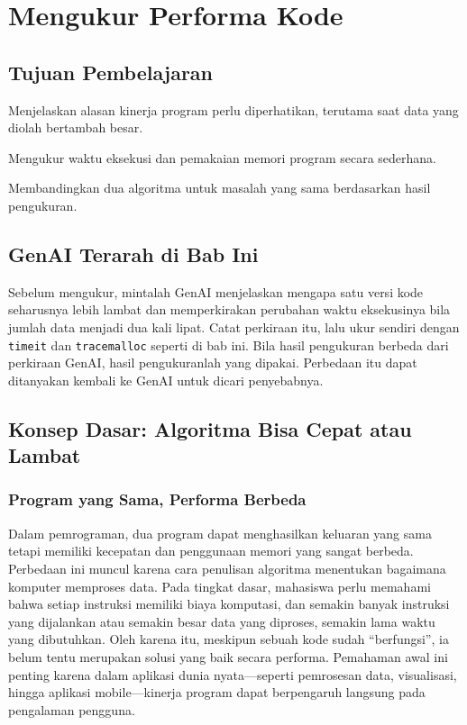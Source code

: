 \chapter{Mengukur Performa Kode}

\section*{Tujuan Pembelajaran}
\begin{daftarrapat}
  \item Menjelaskan alasan kinerja program perlu diperhatikan, terutama saat data yang diolah bertambah besar.
  \item Mengukur waktu eksekusi dan pemakaian memori program secara sederhana.
  \item Membandingkan dua algoritma untuk masalah yang sama berdasarkan hasil pengukuran.
\end{daftarrapat}

\section*{GenAI Terarah di Bab Ini}

Sebelum mengukur, mintalah GenAI menjelaskan mengapa satu versi kode seharusnya lebih lambat dan memperkirakan perubahan waktu eksekusinya bila jumlah data menjadi dua kali lipat. Catat perkiraan itu, lalu ukur sendiri dengan \texttt{timeit} dan \texttt{tracemalloc} seperti di bab ini. Bila hasil pengukuran berbeda dari perkiraan GenAI, hasil pengukuranlah yang dipakai. Perbedaan itu dapat ditanyakan kembali ke GenAI untuk dicari penyebabnya.

\section{Konsep Dasar: Algoritma Bisa Cepat atau Lambat}

\subsection{Program yang Sama, Performa Berbeda}

Dalam pemrograman, dua program dapat menghasilkan keluaran yang sama tetapi memiliki kecepatan dan penggunaan memori yang sangat berbeda. Perbedaan ini muncul karena cara penulisan algoritma menentukan bagaimana komputer memproses data. Pada tingkat dasar, mahasiswa perlu memahami bahwa setiap instruksi memiliki biaya komputasi, dan semakin banyak instruksi yang dijalankan atau semakin besar data yang diproses, semakin lama waktu yang dibutuhkan. Oleh karena itu, meskipun sebuah kode sudah “berfungsi”, ia belum tentu merupakan solusi yang baik secara performa. Pemahaman awal ini penting karena dalam aplikasi dunia nyata—seperti pemrosesan data, visualisasi, hingga aplikasi mobile—kinerja program dapat berpengaruh langsung pada pengalaman pengguna.

